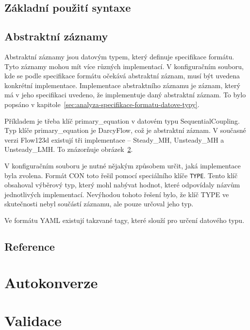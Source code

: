 \documentclass[FM,bw,DP]{tulthesis}
\begin{document}
\subsection{Základní použití syntaxe}


\subsection{Abstraktní záznamy}

Abstraktní záznamy jsou datovým typem, který definuje specifikace formátu. Tyto záznamy mohou mít více různých implementací. V konfiguračním souboru, kde se podle specifikace formátu očekává abstraktní záznam, musí být uvedena konkrétní implementace. Implementace abstraktního záznamu je záznam, který má v jeho specifikaci uvedeno, že implementuje daný abstraktní záznam. To bylo popsáno v kapitole~\ref{sec:analyza-specifikace-formatu-datove-typy}.

Příkladem je třeba klíč primary\_equation v datovém typu SequentialCoupling. Typ klíče primary\_equation je DarcyFlow, což je abstraktní záznam. V současné verzi Flow123d existují tři implementace -- Steady\_MH, Unsteady\_MH a Unsteady\_LMH. To znázorňuje obrázek~\ref{}.

V konfiguračním souboru je nutné nějakým způsobem určit, jaká implementace byla zvolena. Formát CON toto řešil pomocí speciálního klíče \texttt{TYPE}. Tento klíč obsahoval výběrový typ, který mohl nabývat hodnot, které odpovídaly názvům jednotlivých implementací. Nevýhodou tohoto řešení bylo, že klíč TYPE ve skutečnosti nebyl součástí záznamu, ale pouze určoval jeho typ.

Ve formátu YAML existují takzvané tagy, které slouží pro určení datového typu. 


\subsection{Reference}

\section{Autokonverze}

\section{Validace}
\end{document}
